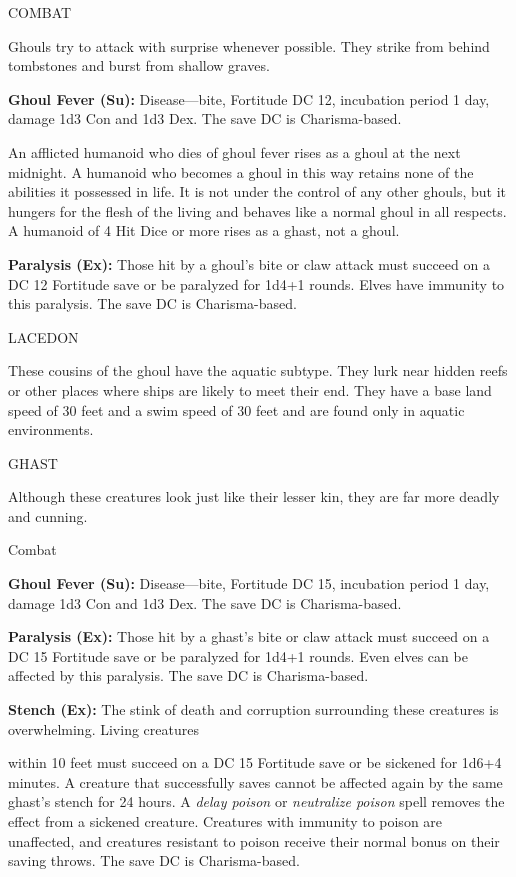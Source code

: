 \documentclass{article}
\begin{document}
COMBAT

Ghouls try to attack with surprise whenever possible. They strike from behind tombstones 
and burst from shallow graves.

\textbf{Ghoul Fever (Su):} Disease---bite, Fortitude DC 12, incubation period 1 
day, damage 1d3 Con and 1d3 Dex. The save DC is Charisma-based.

An afflicted humanoid who dies of ghoul fever rises as a ghoul at the next midnight. 
A humanoid who becomes a ghoul in this way retains none of the abilities it possessed 
in life. It is not under the control of any other ghouls, but it hungers for the 
flesh of the living and behaves like a normal ghoul in all respects. A humanoid 
of 4 Hit Dice or more rises as a ghast, not a ghoul.

\textbf{Paralysis (Ex):} Those hit by a ghoul's bite or claw attack must succeed 
on a DC 12 Fortitude save or be paralyzed for 1d4+1 rounds. Elves have immunity 
to this paralysis. The save DC is Charisma-based.

LACEDON

These cousins of the ghoul have the aquatic subtype. They lurk near hidden reefs 
or other places where ships are likely to meet their end. They have a base land 
speed of 30 feet and a swim speed of 30 feet and are found only in aquatic environments.

GHAST

Although these creatures look just like their lesser kin, they are far more deadly 
and cunning.

Combat

\textbf{Ghoul Fever (Su):} Disease---bite, Fortitude DC 15, incubation period 1 
day, damage 1d3 Con and 1d3 Dex. The save DC is Charisma-based.

\textbf{Paralysis (Ex): }Those hit by a ghast's bite or claw attack must succeed 
on a DC 15 Fortitude save or be paralyzed for 1d4+1 rounds. Even elves can be affected 
by this paralysis. The save DC is Charisma-based.

\textbf{Stench (Ex):} The stink of death and corruption surrounding these creatures 
is overwhelming. Living creatures

within 10 feet must succeed on a DC 15 Fortitude save or be sickened for 1d6+4 
minutes. A creature that successfully saves cannot be affected again by the same 
ghast's stench for 24 hours. A \textit{delay poison }or \textit{neutralize poison 
}spell removes the effect from a sickened creature. Creatures with immunity to 
poison are unaffected, and creatures resistant to poison receive their normal bonus 
on their saving throws. The save DC is Charisma-based.
\end{document}
